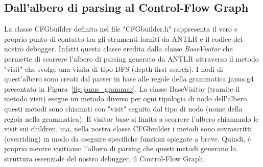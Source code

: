 \documentclass{article}
\theoremstyle{plain}
\theoremstyle{definition}
\theoremstyle{plain}
\begin{document}
\subsection{Dall'albero di parsing al Control-Flow Graph}
La classe CFGbuilder definita nel file "CFGbuilder.h" rappresenta il vero e proprio punto di contatto tra gli strumenti forniti da ANTLR e il codice del nostro debugger. Infatti questa classe eredita dalla classe \emph{BaseVisitor} che permette di scorrere l'albero di parsing generato da ANTLR attraverso il metodo "visit" che svolge una visita di tipo DFS (depth-first search). I nodi di quest'albero sono creati dal parser in base alle regole della grammatica janus.g4 presentata in Figura~\ref{fig:janus_grammar}. La classe BaseVisitor (tramite il metodo visit) esegue un metodo diverso per ogni tipologia di nodo dell'albero, questi metodi sono chiamati con "visit" seguito dal tipo di nodo (nome della regola nella grammatica). Il visitor base si limita a scorrere l'albero chiamando le visit sui children, ma, nella nostra classe CFGbuilder i metodi sono sovrascritti (overriding) in modo da eseguire specifiche funzioni spiegate a breve. Quindi, é proprio mentre visitiamo l'albero di parsing che questi metodi generano la struttura essenziale del nostro debugger, il Control-Flow Graph.\bigskip
\end{document}
